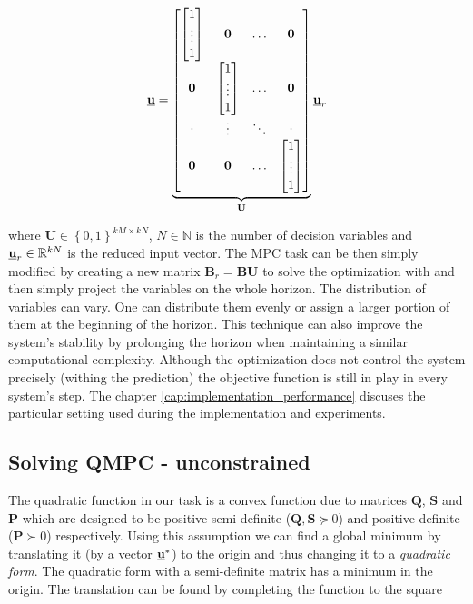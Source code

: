 \begin{equation}
\textbf{\underline{u}} = \underbrace{\begin{bmatrix}
\begin{bmatrix}
1\\
\vdots\\
1
\end{bmatrix} & \textbf{0} & \hdots & \textbf{0} \\
\textbf{0} & \begin{bmatrix}
1\\
\vdots\\
1
\end{bmatrix} & \hdots & \textbf{0}\\
\vdots & \vdots & \ddots & \vdots \\
\textbf{0} & \textbf{0} & \hdots & \begin{bmatrix}
1\\
\vdots\\
1
\end{bmatrix}
\end{bmatrix}}_{\textbf{U}}\textbf{\underline{u}}_{r}
\label{eq:moveblocking_example}
\end{equation}

where $\textbf{U} \in \left\lbrace 0, 1 \right\rbrace ^{kM \times kN}$, $N \in \mathbb{N}$ is the number of decision variables and $\textbf{\underline{u}}_{r} \in \mathbb{R}^{kN}$ is the reduced input vector. The MPC task can be then simply modified by creating a new matrix $\textbf{\^B}_{r} = \textbf{\^B}\textbf{U}$ to solve the optimization with and then simply project the variables on the whole horizon. The distribution of variables can vary. One can distribute them evenly or assign a larger portion of them at the beginning of the horizon. This technique can also improve the system's stability by prolonging the horizon when maintaining a similar computational complexity. Although the optimization does not control the system precisely (withing the prediction) the objective function is still in play in every system's step. The chapter \ref{cap:implementation_performance} discuses the particular setting used during the implementation and experiments.

\subsection{Solving QMPC - unconstrained}
\label{cap:qmpc_unconstrained}

The quadratic function in our task is a convex function due to matrices $\textbf{Q}$, $\textbf{S}$ and $\textbf{P}$ which are designed to be positive semi-definite ($\textbf{Q}, \textbf{S} \succeq 0$) and positive definite ($\textbf{P} \succ 0$) respectively. Using this assumption we can find a global minimum by translating it (by a vector $\textbf{\underline{u}}^*$) to the origin and thus changing it to a \textit{quadratic form}. The quadratic form with a semi-definite matrix has a minimum in the origin. The translation can be found by completing the function to the square

